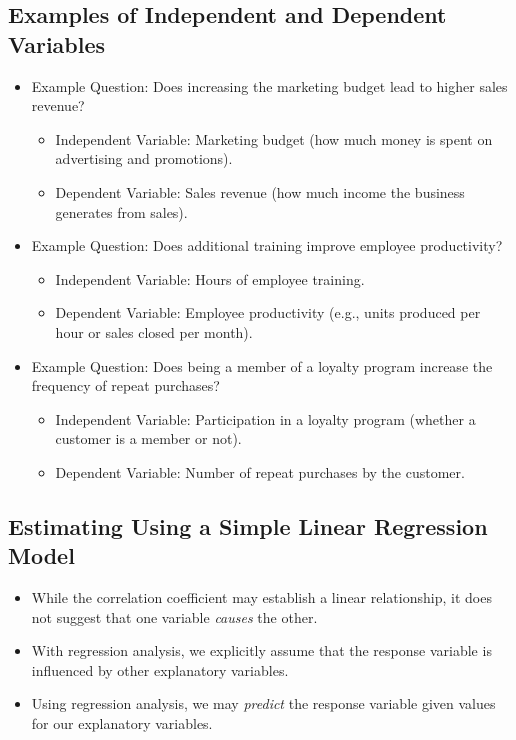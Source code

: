 \documentclass[
  letterpaper,
  DIV=11,
  numbers=noendperiod]{scrreprt}
\providecommand{\tightlist}{%
  \setlength{\itemsep}{0pt}\setlength{\parskip}{0pt}}\usepackage{longtable,booktabs,array}
\begin{document}
\subsection{Examples of Independent and Dependent
Variables}\label{examples-of-independent-and-dependent-variables}

\begin{itemize}
\tightlist
\item
  Example Question: Does increasing the marketing budget lead to higher
  sales revenue?

  \begin{itemize}
  \tightlist
  \item
    Independent Variable: Marketing budget (how much money is spent on
    advertising and promotions).
  \item
    Dependent Variable: Sales revenue (how much income the business
    generates from sales).
  \end{itemize}
\item
  Example Question: Does additional training improve employee
  productivity?

  \begin{itemize}
  \tightlist
  \item
    Independent Variable: Hours of employee training.
  \item
    Dependent Variable: Employee productivity (e.g., units produced per
    hour or sales closed per month).
  \end{itemize}
\item
  Example Question: Does being a member of a loyalty program increase
  the frequency of repeat purchases?

  \begin{itemize}
  \tightlist
  \item
    Independent Variable: Participation in a loyalty program (whether a
    customer is a member or not).
  \item
    Dependent Variable: Number of repeat purchases by the customer.
  \end{itemize}
\end{itemize}

\subsection{Estimating Using a Simple Linear Regression
Model}\label{estimating-using-a-simple-linear-regression-model}

\begin{itemize}
\tightlist
\item
  While the correlation coefficient may establish a linear relationship,
  it does not suggest that one variable \emph{causes} the other.
\item
  With regression analysis, we explicitly assume that the response
  variable is influenced by other explanatory variables.
\item
  Using regression analysis, we may \emph{predict} the response variable
  given values for our explanatory variables.
\end{itemize}
\end{document}
